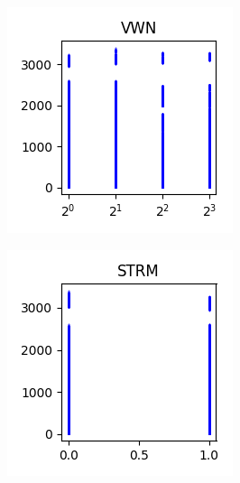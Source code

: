 \documentclass[sigconf,authorversion]{acmart}
\begin{document}
\begin{figure}[htb]\ContinuedFloat
    \centering
    \begin{subfigure}[b]{0.3\textwidth}
        \includegraphics[width=\textwidth]{img/VWN.png}
        \label{fig:vwn}
    \end{subfigure}
    \begin{subfigure}[b]{0.3\textwidth}
        \includegraphics[width=\textwidth]{img/STRM.png}

\end{subfigure}
\end{figure}
\end{document}
